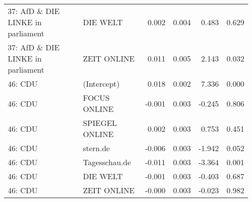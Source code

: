 \begin{adjustbox}{width=\textwidth,totalheight=\textheight,keepaspectratio}
\begin{tabular}{llrrrr}
  37: AfD \& DIE LINKE in parliament & DIE WELT & 0.002 & 0.004 & 0.483 & 0.629 \\ 
  37: AfD \& DIE LINKE in parliament & ZEIT ONLINE & 0.011 & 0.005 & 2.143 & 0.032 \\ 
  46: CDU & (Intercept) & 0.018 & 0.002 & 7.336 & 0.000 \\ 
  46: CDU & FOCUS ONLINE & -0.001 & 0.003 & -0.245 & 0.806 \\ 
  46: CDU & SPIEGEL ONLINE & 0.002 & 0.003 & 0.753 & 0.451 \\ 
  46: CDU & stern.de & -0.006 & 0.003 & -1.942 & 0.052 \\ 
  46: CDU & Tagesschau.de & -0.011 & 0.003 & -3.364 & 0.001 \\ 
  46: CDU & DIE WELT & -0.001 & 0.003 & -0.403 & 0.687 \\ 
  46: CDU & ZEIT ONLINE & -0.000 & 0.003 & -0.023 & 0.982 \\ 
   \hline
\end{tabular}
\end{adjustbox}
